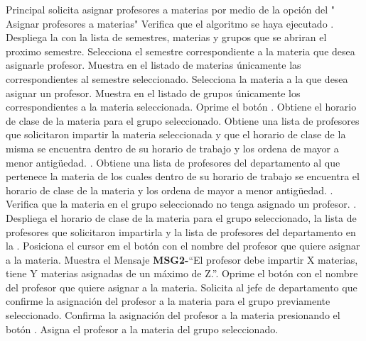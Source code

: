 \begin{UCtrayectoria}{Principal}
	\UCpaso[\UCactor] solicita asignar profesores a materias por medio de la opción del   " Asignar profesores a materias"
	\UCpaso Verifica que el algoritmo se haya ejecutado . 
	\UCpaso Despliega la  con la lista de semestres, materias y grupos que se abriran el proximo semestre.
	\UCpaso[\UCactor] Selecciona el semestre correspondiente a la materia que desea asignarle profesor.
	\UCpaso Muestra en el listado de materias únicamente las correspondientes al semestre seleccionado.
	\UCpaso[\UCactor] Selecciona la materia a la que desea asignar un profesor.
	\UCpaso Muestra en el listado de grupos únicamente los correspondientes a la materia seleccionada.
	\UCpaso[\UCactor] Oprime el botón .
	\UCpaso Obtiene el horario de clase de la materia para el grupo seleccionado.
	\UCpaso Obtiene una lista de profesores que solicitaron impartir la materia seleccionada y que el horario de clase de la misma se encuentra dentro de su horario de trabajo y los ordena de mayor a menor antigüedad.  \label{CUGH7SegundaLista}.  
	\UCpaso Obtiene una lista de profesores del departamento al que pertenece la materia de los cuales dentro de su horario de trabajo se encuentra el horario de clase de la materia y los ordena de mayor a menor antigüedad. . 
	 \UCpaso Verifica que la materia en el grupo seleccionado no tenga asignado un profesor.  \label{CUGH7Desplegar} .  
	\UCpaso Despliega el horario de clase de la materia para el grupo seleccionado, la lista de profesores que solicitaron impartirla y la lista de profesores del departamento en la  .
	\UCpaso[\UCactor] Posiciona el cursor em el botón  con el nombre del profesor que quiere asignar a la materia.
	\UCpaso Muestra el Mensaje {\bf MSG2-}``El profesor debe impartir X materias, tiene Y materias asignadas de un máximo de Z.''.
	\UCpaso[\UCactor] Oprime el botón  con el nombre del profesor que quiere asignar a la materia.
	\UCpaso Solicita al jefe de departamento que confirme la asignación del profesor a la materia para el grupo previamente seleccionado.
	\UCpaso[\UCactor] Confirma la asignación del profesor a la materia presionando el botón .
	\UCpaso Asigna el profesor a la materia del grupo seleccionado.	
\end{UCtrayectoria}

